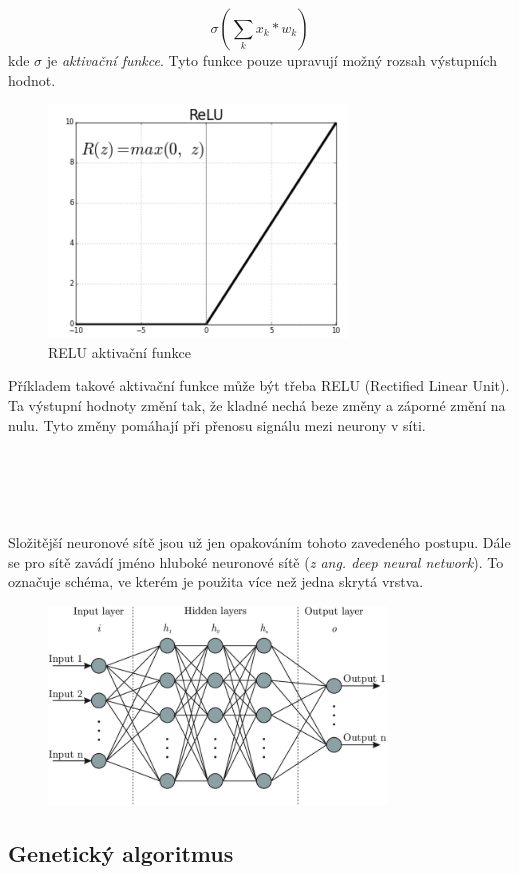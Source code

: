 \documentclass[a4paper,12pt]{article}
\begin{document}
        \begin{equation}
            \sigma(\displaystyle\sum_{k}{x_k * w_k})
        \end{equation}
        kde $\sigma$ je \textit{aktivační funkce}. Tyto funkce pouze upravují možný rozsah výstupních 
        hodnot.
        \begin{figure}
            \centering
            \includegraphics[width=0.8\linewidth]{data/relu.png}
            \caption{RELU aktivační funkce} 
            \label{fig:relu}
        \end{figure}

        \vspace{0.75cm}Příkladem takové aktivační funkce může být třeba RELU (Rectified Linear Unit).
        Ta výstupní hodnoty změní tak, že kladné nechá beze změny a záporné změní na nulu.
        Tyto změny pomáhají při přenosu signálu mezi neurony v síti.
        \\\\\\\\\\\\
        Složitější neuronové sítě jsou už jen opakováním tohoto zavedeného postupu. Dále se pro sítě 
        zavádí jméno hluboké neuronové sítě (\textit{z ang. deep neural network}). 
        To označuje schéma, ve kterém je použita více než jedna skrytá vrstva.
        \begin{figure}[h]
            \centering
            \centering
            \includegraphics[width=0.8\textwidth]{data/nn-scheme.png}
            \label{fig:deepnn}
        \end{figure}

    \subsection{Genetický algoritmus}
\end{document}
